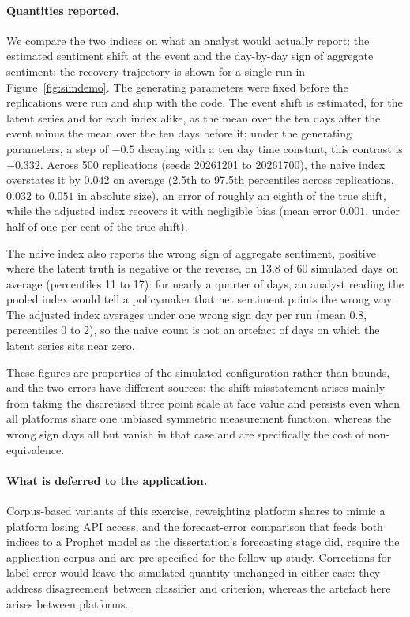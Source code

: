 \paragraph{Quantities reported.}
We compare the two indices on what an analyst would actually report: the estimated sentiment shift at the event and the day-by-day sign of aggregate sentiment; the recovery trajectory is shown for a single run in Figure~\ref{fig:simdemo}. The generating parameters were fixed before the replications were run and ship with the code. The event shift is estimated, for the latent series and for each index alike, as the mean over the ten days after the event minus the mean over the ten days before it; under the generating parameters, a step of $-0.5$ decaying with a ten day time constant, this contrast is $-0.332$. Across 500 replications (seeds 20261201 to 20261700), the naive index overstates it by $0.042$ on average (2.5th to 97.5th percentiles across replications, $0.032$ to $0.051$ in absolute size), an error of roughly an eighth of the true shift, while the adjusted index recovers it with negligible bias (mean error $0.001$, under half of one per cent of the true shift).

The naive index also reports the wrong sign of aggregate sentiment, positive where the latent truth is negative or the reverse, on 13.8 of 60 simulated days on average (percentiles 11 to 17): for nearly a quarter of days, an analyst reading the pooled index would tell a policymaker that net sentiment points the wrong way. The adjusted index averages under one wrong sign day per run (mean 0.8, percentiles 0 to 2), so the naive count is not an artefact of days on which the latent series sits near zero.

These figures are properties of the simulated configuration rather than bounds, and the two errors have different sources: the shift misstatement arises mainly from taking the discretised three point scale at face value and persists even when all platforms share one unbiased symmetric measurement function, whereas the wrong sign days all but vanish in that case and are specifically the cost of non-equivalence.

\paragraph{What is deferred to the application.}
Corpus-based variants of this exercise, reweighting platform shares to mimic a platform losing API access, and the forecast-error comparison that feeds both indices to a Prophet model as the dissertation's forecasting stage did, require the application corpus and are pre-specified for the follow-up study. Corrections for label error \citep{egami2023} would leave the simulated quantity unchanged in either case: they address disagreement between classifier and criterion, whereas the artefact here arises between platforms.

